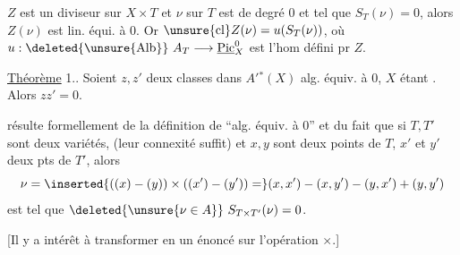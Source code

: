 \(Z\) est un diviseur sur \(X\times T\) et \(\nu\) sur \(T\) est de degré 0 et tel que \(S_T(\nu)=0\), alors \(Z(\nu)\) est lin. équi. à 0. Or \(\unsure{\operatorname{cl}}Z(\nu)=u(S_T(\nu))\), où \(u:\deleted{\unsure{\operatorname{Alb}}}\ A_T\longrightarrow\underline{\operatorname{Pic}}_X^0\) est l'hom défini pr \(Z\).

\uline{Théorème} 1.. Soient \(z,z'\) deux classes dans \(A'{}^*(X)\) alg. équiv. à 0, \(X\) étant \deleted{[projective]}. Alors \(zz'=0\). 

  résulte formellement de la définition de ``alg. équiv. à 0''  et du fait que si \(T,T'\) sont deux  variétés,  (leur connexité suffit) et \(x,y\) sont deux points de \(T\), \(x'\) et \(y'\) deux pts de \(T'\), alors
\[
\nu=\inserted{((x)-(y))\times((x')-(y'))=}(x,x')-(x,y')-(y,x')+(y,y')
\]
est tel que \(\deleted{\unsure{\nu\in A}}\ S_{T\times T'}(\nu)=0\).

[Il y a intérêt à transformer   en un énoncé sur l'opération \(\times\).]
